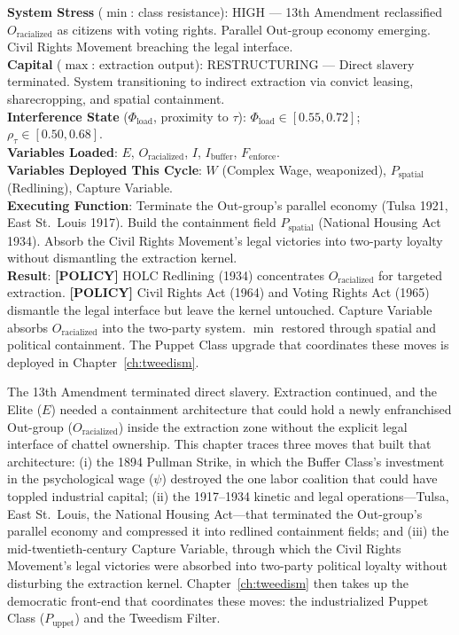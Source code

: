 \begin{tcolorbox}[colback=black!5, colframe=black!70, fonttitle=\bfseries\ttfamily, title=RUNTIME LOG: 1894--1965 (POST-EMANCIPATION CONTAINMENT)]
\ttfamily\small
\textbf{System Stress} ($\min$: class resistance): HIGH --- 13th Amendment reclassified $O_{\text{racialized}}$ as citizens with voting rights. Parallel Out-group economy emerging. Civil Rights Movement breaching the legal interface.\\
\textbf{Capital} ($\max$: extraction output): RESTRUCTURING --- Direct slavery terminated. System transitioning to indirect extraction via convict leasing, sharecropping, and spatial containment.\\
\textbf{Interference State} ($\Phi_{\text{load}}$, proximity to $\tau$): $\Phi_{\text{load}} \in [0.55, 0.72]$; $\rho_{\tau} \in [0.50, 0.68]$.\\
\textbf{Variables Loaded}: $E$, $O_{\text{racialized}}$, $I$, $I_{\text{buffer}}$, $F_{\text{enforce}}$.\\
\textbf{Variables Deployed This Cycle}: $W$ (Complex Wage, weaponized), $P_{\text{spatial}}$ (Redlining), Capture Variable.\\
\textbf{Executing Function}: Terminate the Out-group's parallel economy (Tulsa 1921, East St.\ Louis 1917). Build the containment field $P_{\text{spatial}}$ (National Housing Act 1934). Absorb the Civil Rights Movement's legal victories into two-party loyalty without dismantling the extraction kernel.\\
\textbf{Result}: \textbf{[POLICY]} HOLC Redlining (1934) concentrates $O_{\text{racialized}}$ for targeted extraction. \textbf{[POLICY]} Civil Rights Act (1964) and Voting Rights Act (1965) dismantle the legal interface but leave the kernel untouched. Capture Variable absorbs $O_{\text{racialized}}$ into the two-party system. $\min$ restored through spatial and political containment. The Puppet Class upgrade that coordinates these moves is deployed in Chapter~\ref{ch:tweedism}.
\end{tcolorbox}

\medskip

The 13th Amendment terminated direct slavery. Extraction continued, and the Elite ($E$) needed a containment architecture that could hold a newly enfranchised Out-group ($O_{\text{racialized}}$) inside the extraction zone without the explicit legal interface of chattel ownership. This chapter traces three moves that built that architecture: (i) the 1894 Pullman Strike, in which the Buffer Class's investment in the psychological wage ($\psi$) destroyed the one labor coalition that could have toppled industrial capital; (ii) the 1917--1934 kinetic and legal operations---Tulsa, East St.\ Louis, the National Housing Act---that terminated the Out-group's parallel economy and compressed it into redlined containment fields; and (iii) the mid-twentieth-century Capture Variable, through which the Civil Rights Movement's legal victories were absorbed into two-party political loyalty without disturbing the extraction kernel. Chapter~\ref{ch:tweedism} then takes up the democratic front-end that coordinates these moves: the industrialized Puppet Class ($P_{\text{uppet}}$) and the Tweedism Filter.

